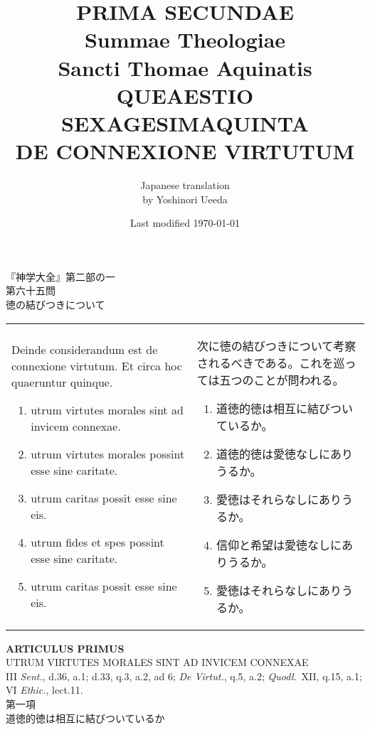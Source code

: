 \documentclass[10pt]{jsarticle}
\title{{\bf PRIMA SECUNDAE}\\{\HUGE Summae Theologiae}\\Sancti Thomae
Aquinatis\\{\sffamily QUEAESTIO SEXAGESIMAQUINTA}\\DE CONNEXIONE VIRTUTUM}
\author{Japanese translation\\by Yoshinori {\sc Ueeda}}
\date{Last modified \today}
\begin{document}
\maketitle
\thispagestyle{empty}

\begin{center}
{\LARGE 『神学大全』第二部の一}\\
{\Large 第六十五問\\徳の結びつきについて}
\end{center}

\begin{longtable}{p{21em}p{21em}}
Deinde considerandum est de connexione virtutum. Et circa hoc
quaeruntur quinque. 

\begin{enumerate}
 \item utrum virtutes morales sint ad invicem connexae.
 \item utrum virtutes morales possint esse sine caritate.
 \item utrum caritas possit esse sine eis.
 \item utrum fides et spes possint esse sine caritate.
 \item utrum caritas possit esse sine eis.
\end{enumerate}

&

 次に徳の結びつきについて考察されるべきである。これを巡っては五つのことが問われる。

\begin{enumerate}
 \item 道徳的徳は相互に結びついているか。
 \item 道徳的徳は愛徳なしにありうるか。
 \item 愛徳はそれらなしにありうるか。
 \item 信仰と希望は愛徳なしにありうるか。
 \item 愛徳はそれらなしにありうるか。
\end{enumerate}
\end{longtable}

\newpage



\begin{center}
{\Large {\bf ARTICULUS PRIMUS}}\\
{\large UTRUM VIRTUTES MORALES SINT AD INVICEM CONNEXAE}\\
 {\footnotesize III {\itshape Sent.}, d.36, a.1; d.33, q.3, a.2, ad 6; {\itshape De Virtut.}, q.5, a.2; {\itshape Quodl}.~XII, q.15, a.1; VI {\itshape Ethic.}, lect.11.}\\
{\Large 第一項\\道徳的徳は相互に結びついているか}
\end{center}
\end{document}
